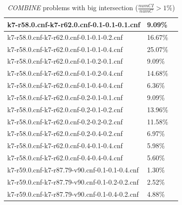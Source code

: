 \documentclass[12pt,a4paper,twoside]{scrartcl}
\numberwithin{equation}{section}
\begin{document}
\begin{table}[H]
\begin{center}
\begin{tabular}{|l|l|p{1cm}|}
k7-r58.0.cnf-k7-r62.0.cnf-0.1-0.1-0.1.cnf&	9.09\%\\  \hline
k7-r58.0.cnf-k7-r62.0.cnf-0.1-0.1-0.2.cnf&	16.67\%\\  \hline
k7-r58.0.cnf-k7-r62.0.cnf-0.1-0.1-0.4.cnf&	25.07\%\\  \hline
k7-r58.0.cnf-k7-r62.0.cnf-0.1-0.2-0.1.cnf&	9.09\%\\  \hline
k7-r58.0.cnf-k7-r62.0.cnf-0.1-0.2-0.4.cnf&	14.68\%\\  \hline
k7-r58.0.cnf-k7-r62.0.cnf-0.1-0.4-0.4.cnf&	6.36\%\\  \hline
k7-r58.0.cnf-k7-r62.0.cnf-0.2-0.1-0.1.cnf&	9.09\%\\  \hline
k7-r58.0.cnf-k7-r62.0.cnf-0.2-0.1-0.2.cnf&	13.96\%\\  \hline
k7-r58.0.cnf-k7-r62.0.cnf-0.2-0.2-0.2.cnf&	11.58\%\\  \hline
k7-r58.0.cnf-k7-r62.0.cnf-0.2-0.4-0.2.cnf&	6.97\%\\  \hline
k7-r58.0.cnf-k7-r62.0.cnf-0.4-0.1-0.4.cnf&	5.98\%\\  \hline
k7-r58.0.cnf-k7-r62.0.cnf-0.4-0.4-0.4.cnf&	5.60\%\\  \hline
k7-r59.0.cnf-k7-r87.79-v90.cnf-0.1-0.1-0.4.cnf&	1.30\%\\  \hline
k7-r59.0.cnf-k7-r87.79-v90.cnf-0.1-0.2-0.2.cnf&	2.52\%\\  \hline
k7-r59.0.cnf-k7-r87.79-v90.cnf-0.1-0.4-0.2.cnf&	4.88\%\\  \hline
\end{tabular}
 \caption[Caption for LOF]{\emph{COMBINE} problems with big intersection ($\frac{numCI}{numC} > 1\%$)\footnotemark}
\end{center}
\end{table} 
\end{document}
